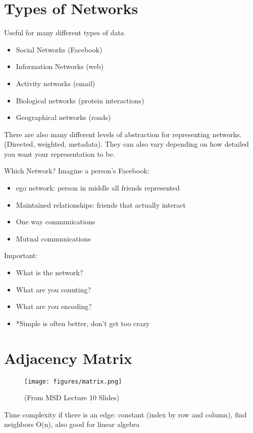 \section{ Types of Networks}
Useful for many different types of data
\begin{itemize}
    \item Social Networks (Facebook)
    \item Information Networks (web) 
    \item Activity networks (email)
    \item Biological networks (protein interactions)
    \item Geographical networks (roads) 
\end{itemize}
There are also many different levels of abstraction for representing networks.(Directed, weighted, metadata). They can also vary depending on how detailed you want your representation to be. 

Which Network? Imagine a person's Facebook: 
\begin{itemize}
    \item ego network: person in middle all friends represented
    \item Maintained relationships: friends that actually interact
    \item One way communications
    \item Mutual communications 
\end{itemize}
Important: 
\begin{itemize}
    \item What is the network?
    \item What are you counting?
    \item What are you encoding?
    \item *Simple is often better, don't get too crazy 
\end{itemize}
\clearpage
\section{Adjacency Matrix}
\begin{figure}[ht]
  \begin{center}
    \texttt{[image: figures/matrix.png]}
    \caption{(From MSD Lecture 10 Slides) 
     }
    \label{fig:example_figure}
  \end{center}
\end{figure}

 Time complexity if there is an edge: constant (index by row and column), find neighbors O(n), also good for linear algebra
 
